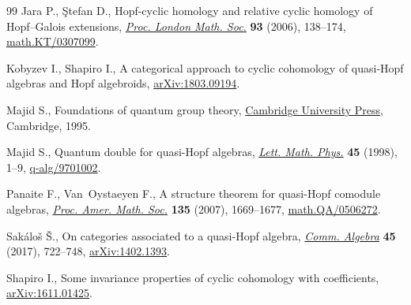 \begin{thebibliography}{99}
Jara P., \c{S}tefan D., Hopf-cyclic homology and relative cyclic homology of
 {H}opf--{G}alois extensions, \href{https://doi.org/10.1017/S0024611506015772}{\textit{Proc. London Math. Soc.}} \textbf{93}
 (2006), 138--174, \href{https://arxiv.org/abs/math.KT/0307099}{math.KT/0307099}.

Kobyzev I., Shapiro I., A categorical approach to cyclic cohomology of
 quasi-{H}opf algebras and {H}opf algebroids, \href{https://arxiv.org/abs/1803.09194}{arXiv:1803.09194}.

Majid S., Foundations of quantum group theory, \href{https://doi.org/10.1017/CBO9780511613104}{Cambridge University Press},
 Cambridge, 1995.

Majid S., Quantum double for quasi-{H}opf algebras, \href{https://doi.org/10.1023/A:1007450123281}{\textit{Lett. Math. Phys.}}
 \textbf{45} (1998), 1--9, \href{https://arxiv.org/abs/q-alg/9701002}{q-alg/9701002}.

Panaite F., Van~Oystaeyen F., A structure theorem for quasi-{H}opf comodule
 algebras, \href{https://doi.org/10.1090/S0002-9939-07-08712-6}{\textit{Proc. Amer. Math. Soc.}} \textbf{135} (2007), 1669--1677,
 \href{https://arxiv.org/abs/math.QA/0506272}{math.QA/0506272}.

Sak\'alo\v{s} {\v{S}}., On categories associated to a quasi-{H}opf algebra,
 \href{https://doi.org/10.1080/00927872.2016.1175449}{\textit{Comm. Algebra}} \textbf{45} (2017), 722--748, \href{https://arxiv.org/abs/1402.1393}{arXiv:1402.1393}.

Shapiro I., Some invariance properties of cyclic cohomology with coefficients,
 \href{https://arxiv.org/abs/1611.01425}{arXiv:1611.01425}.

\end{thebibliography}
